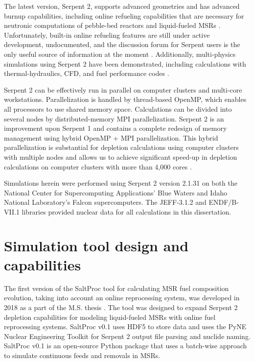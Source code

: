 The latest version, Serpent 2, supports advanced geometries and has advanced 
burnup capabilities, including online refueling capabilities that are 
necessary for neutronic computations of pebble-bed reactors and liquid-fueled 
\glspl{MSR} \cite{aufiero_extended_2013}. Unfortunately, built-in online 
refueling features are still under active development, undocumented, and the 
discussion forum for Serpent users is the only useful source of information at 
the moment \cite{aufiero_extended_2013}. Additionally, multi-physics 
simulations using Serpent 2 have been demonstrated, including  calculations 
with thermal-hydraulics, \gls{CFD}, and fuel performance codes 
\cite{leppanen_numerical_2015}. 

Serpent 2 can be effectively run in parallel on computer clusters and 
multi-core workstations. Parallelization is handled by thread-based OpenMP, 
which enables all processors to use shared memory space. Calculations can be 
divided into several nodes by distributed-memory \gls{MPI} parallelization. 
Serpent 2  is an improvement upon Serpent 1 and contains a complete redesign 
of memory management using hybrid OpenMP \cite{dagum_openmp_1998} + \gls{MPI} 
parallelization.  This hybrid parallelization is substantial for depletion 
calculations using computer clusters with multiple nodes and allows us to 
achieve significant speed-up in depletion calculations on computer clusters 
with more than 4,000 cores \cite{leppanen_serpent_2014}. 

Simulations herein were performed using Serpent 2 version 2.1.31 on both the 
National Center for Supercomputing Applications' Blue Waters and Idaho 
National Laboratory's Falcon supercomputers. The JEFF-3.1.2 
\cite{oecd/nea_jeff-3.1.2_2014} and ENDF/B-VII.1 
\cite{chadwick_endf/b-vii.1_2011} libraries provided nuclear data 
for all calculations in this dissertation. 

\section{Simulation tool design and capabilities}\label{sec:tool_design}
The first version of the SaltProc tool for calculating \gls{MSR} fuel 
composition evolution, taking into account an online reprocessing system,  
was developed in 2018 as a part of the M.S. thesis  
\cite{rykhlevskii_arfc/saltproc_2018, rykhlevskii_advanced_2018}. The tool was 
designed to expand Serpent 2 depletion capabilities for modeling liquid-fueled 
\glspl{MSR} with online fuel reprocessing systems. SaltProc v0.1 uses HDF5 
\cite{the_hdf_group_hierarchical_1997} to store data and uses the PyNE Nuclear 
Engineering Toolkit \cite{scopatz_pyne_2012} for Serpent 2 output file parsing 
and nuclide naming. SaltProc v0.1 is an open-source Python package that uses a 
batch-wise approach to simulate continuous feeds and removals in \glspl{MSR}. 

